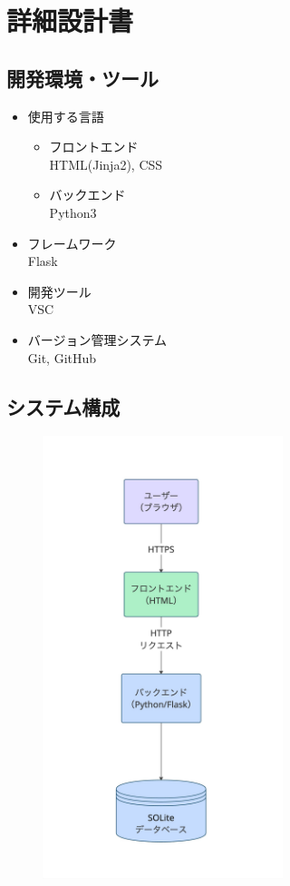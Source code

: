 \documentclass[a4paper, 11pt, titlepage]{jsarticle}
\begin{document}
\section{詳細設計書}

\subsection{開発環境・ツール}
\begin{itemize}
  \item 使用する言語
  \begin{itemize}
    \item フロントエンド\\
    HTML(Jinja2), CSS
    \item バックエンド\\
    Python3
  \end{itemize}
  \item フレームワーク\\
  Flask
  \item 開発ツール\\
  VSC
  \item バージョン管理システム\\
  Git, GitHub
\end{itemize}

\subsection{システム構成}
\begin{figure}[htbp]
\centering
\includegraphics[width=70mm]{systemStructure.jpg}
\label{fig:func}
\end{figure}
\end{document}
